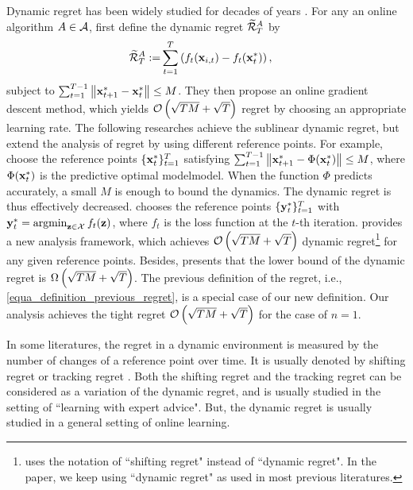 \documentclass{article}
\begin{document}
Dynamic regret has been widely studied for decades of years \citep{Zinkevich:2003,Hall:2015ct,Hall:2013vr,Jadbabaie:2015wg,Yang:2016ud,Bedi:2018te,Zhang:2016wl,Mokhtari:2016jz,Zhang:2018tu,Gyorgy:2016,NIPS2016_6536,Zhao:2018wx}.   For any an online algorithm $A\in{\mathcal{A}}$, \citet{Zinkevich:2003} first define the dynamic regret $\widetilde{{\mathcal{R}}}_T^{A}$ by
\begin{align}
\label{equa_definition_previous_regret}
\widetilde{{\mathcal{R}}}_T^{A} := &  \sum_{t=1}^T \left(  f_{t}({\bf x}_{i,t}) - f_{t}({\bf x}_t^\ast)  \right),
\end{align} subject to $\sum_{t=1}^{T-1} \left\lVert{\bf x}_{t+1}^\ast - {\bf x}_t^\ast\right\rVert \le M$. They then propose an online gradient descent method, which yields ${\mathcal{O}\left( \sqrt{TM}+\sqrt{T} \right)}$ regret by choosing an appropriate learning rate. The following researches achieve the sublinear dynamic regret, but extend the analysis of regret by using different reference points. For example, \citet{Hall:2015ct,Hall:2013vr} choose the reference points $\{{\bf x}_t^{\ast}\}_{t=1}^T$ satisfying $\sum_{t=1}^{T-1} \left\lVert{\bf x}_{t+1}^\ast - \Phi({\bf x}_t^\ast)\right\rVert \le M$, where $\Phi({\bf x}_t^\ast)$ is the predictive optimal modelmodel. When the function $\Phi$ predicts accurately, a small $M$ is enough to bound the dynamics. The dynamic regret is thus effectively decreased. \citet{Jadbabaie:2015wg,Yang:2016ud,Bedi:2018te,Zhang:2016wl,Mokhtari:2016jz,Zhang:2018tu} chooses the reference points $\{{\bf y}_t^{\ast}\}_{t=1}^T$ with $\y_t^{\ast} = \argmin_{\z\in\Xcal} f_t(\z)$, where $f_t$ is the loss function at the $t$-th iteration. \citet{Gyorgy:2016} provides a new analysis framework, which achieves ${\mathcal{O}\left( \sqrt{TM}+\sqrt{T} \right)}$ dynamic regret\footnote{\citet{Gyorgy:2016} uses the notation of ``shifting regret" instead of ``dynamic regret". In the paper, we keep using ``dynamic regret" as used in most previous literatures. } for any given reference points. Besides, \citet{Zhao:2018wx} presents that the lower bound of the dynamic regret is $\Omega\left( \sqrt{TM}+\sqrt{T} \right)$. The previous definition of the regret, i.e., \eqref{equa_definition_previous_regret}, is a special case of our new definition. Our analysis achieves the tight regret ${\mathcal{O}\left( \sqrt{TM}+\sqrt{T} \right)}$ for the case of $n=1$. 

In some literatures, the regret in a dynamic environment is measured by the number of changes of a reference point over time. It is usually denoted by shifting regret or tracking regret \citep{Herbster1998,Gyorgy:2005wo,Gyorgy:2012wa,Gyorgy:2016,Mourtada:2017vn,JMLR:v17:13-533,NIPS2016_6536,cesabianchi:hal,pmlr-v84-mohri18a,pmlr-v54-jun17a}. Both the shifting regret and the tracking regret can be considered as a variation of the dynamic regret, and is usually studied in the setting of ``learning with expert advice". But, the dynamic regret is usually studied in a general setting of online learning.
\end{document}
